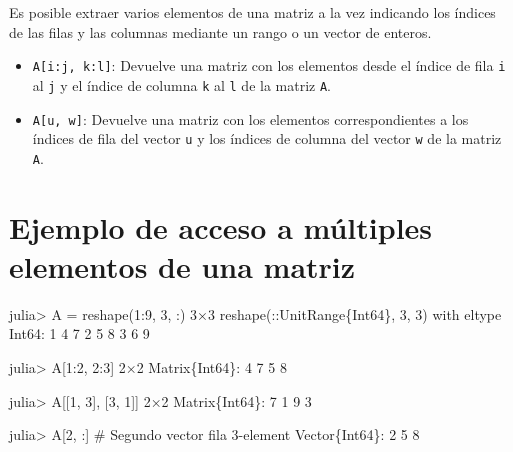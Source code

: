 \documentclass[
  letterpaper,
  DIV=11,
  numbers=noendperiod]{scrreprt}
\newenvironment{Shaded}{\begin{snugshade}}{\end{snugshade}}
\newcommand{\CommentTok}[1]{\textcolor[rgb]{0.37,0.37,0.37}{#1}}
\newcommand{\DataTypeTok}[1]{\textcolor[rgb]{0.68,0.00,0.00}{#1}}
\newcommand{\FloatTok}[1]{\textcolor[rgb]{0.68,0.00,0.00}{#1}}
\newcommand{\FunctionTok}[1]{\textcolor[rgb]{0.28,0.35,0.67}{#1}}
\newcommand{\NormalTok}[1]{\textcolor[rgb]{0.00,0.23,0.31}{#1}}
\newcommand{\OperatorTok}[1]{\textcolor[rgb]{0.37,0.37,0.37}{#1}}
\providecommand{\tightlist}{%
  \setlength{\itemsep}{0pt}\setlength{\parskip}{0pt}}\usepackage{longtable,booktabs,array}
\begin{document}
Es posible extraer varios elementos de una matriz a la vez indicando los
índices de las filas y las columnas mediante un rango o un vector de
enteros.

\begin{itemize}
\tightlist
\item
  \texttt{A{[}i:j,\ k:l{]}}: Devuelve una matriz con los elementos desde
  el índice de fila \texttt{i} al \texttt{j} y el índice de columna
  \texttt{k} al \texttt{l} de la matriz \texttt{A}.
\item
  \texttt{A{[}u,\ w{]}}: Devuelve una matriz con los elementos
  correspondientes a los índices de fila del vector \texttt{u} y los
  índices de columna del vector \texttt{w} de la matriz \texttt{A}.
\end{itemize}

\hypertarget{ejemplo-de-acceso-a-muxfaltiples-elementos-de-una-matriz}{%
\section{Ejemplo de acceso a múltiples elementos de una
matriz}\label{ejemplo-de-acceso-a-muxfaltiples-elementos-de-una-matriz}}

\begin{Shaded}
\begin{Highlighting}[]
\NormalTok{julia}\OperatorTok{\textgreater{}}\NormalTok{ A }\OperatorTok{=} \FunctionTok{reshape}\NormalTok{(}\FloatTok{1}\OperatorTok{:}\FloatTok{9}\NormalTok{, }\FloatTok{3}\NormalTok{, }\OperatorTok{:}\NormalTok{)}
\FloatTok{3}\OperatorTok{×}\FloatTok{3} \FunctionTok{reshape}\NormalTok{(}\OperatorTok{::}\DataTypeTok{UnitRange\{Int64\}}\NormalTok{, }\FloatTok{3}\NormalTok{, }\FloatTok{3}\NormalTok{) with eltype }\DataTypeTok{Int64}\OperatorTok{:}
 \FloatTok{1}  \FloatTok{4}  \FloatTok{7}
 \FloatTok{2}  \FloatTok{5}  \FloatTok{8}
 \FloatTok{3}  \FloatTok{6}  \FloatTok{9}

\NormalTok{julia}\OperatorTok{\textgreater{}}\NormalTok{ A[}\FloatTok{1}\OperatorTok{:}\FloatTok{2}\NormalTok{, }\FloatTok{2}\OperatorTok{:}\FloatTok{3}\NormalTok{]}
\FloatTok{2}\OperatorTok{×}\FloatTok{2} \DataTypeTok{Matrix}\NormalTok{\{}\DataTypeTok{Int64}\NormalTok{\}}\OperatorTok{:}
 \FloatTok{4}  \FloatTok{7}
 \FloatTok{5}  \FloatTok{8}

\NormalTok{julia}\OperatorTok{\textgreater{}}\NormalTok{ A[[}\FloatTok{1}\NormalTok{, }\FloatTok{3}\NormalTok{], [}\FloatTok{3}\NormalTok{, }\FloatTok{1}\NormalTok{]]}
\FloatTok{2}\OperatorTok{×}\FloatTok{2} \DataTypeTok{Matrix}\NormalTok{\{}\DataTypeTok{Int64}\NormalTok{\}}\OperatorTok{:}
 \FloatTok{7}  \FloatTok{1}
 \FloatTok{9}  \FloatTok{3}

\NormalTok{julia}\OperatorTok{\textgreater{}}\NormalTok{ A[}\FloatTok{2}\NormalTok{, }\OperatorTok{:}\NormalTok{]  }\CommentTok{\# Segundo vector fila}
\FloatTok{3}\OperatorTok{{-}}\NormalTok{element }\DataTypeTok{Vector}\NormalTok{\{}\DataTypeTok{Int64}\NormalTok{\}}\OperatorTok{:}
 \FloatTok{2}
 \FloatTok{5}
 \FloatTok{8}
\end{Highlighting}
\end{Shaded}
\end{document}
